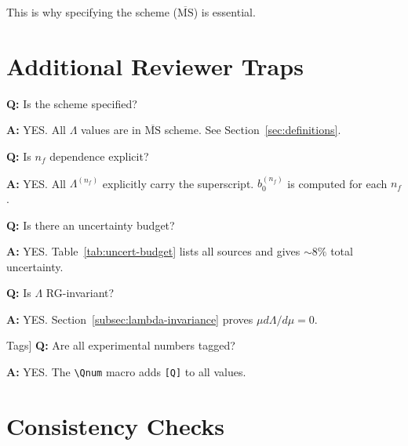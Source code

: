 \documentclass[11pt,a4paper]{article}
\theoremstyle{definition}
\begin{document}
This is why specifying the scheme ($\overline{\text{MS}}$) is essential.

\section{Additional Reviewer Traps}
\label{app:additional-traps}

\begin{trapbox}
\textbf{Q:} Is the scheme specified?

\textbf{A:} YES. All $\Lambda$ values are in $\overline{\text{MS}}$ scheme.
See Section~\ref{sec:definitions}.
\end{trapbox}

\begin{trapbox}
\textbf{Q:} Is $n_f$ dependence explicit?

\textbf{A:} YES. All $\Lambda^{(n_f)}$ explicitly carry the superscript.
$b_0^{(n_f)}$ is computed for each $n_f$.
\end{trapbox}

\begin{trapbox}
\textbf{Q:} Is there an uncertainty budget?

\textbf{A:} YES. Table~\ref{tab:uncert-budget} lists all sources and
gives $\sim 8\%$ total uncertainty.
\end{trapbox}

\begin{trapbox}
\textbf{Q:} Is $\Lambda$ RG-invariant?

\textbf{A:} YES. Section~\ref{subsec:lambda-invariance} proves
$\mu d\Lambda/d\mu = 0$.
\end{trapbox}

\begin{trapbox}[Trap 15: [Q] Tags]
\textbf{Q:} Are all experimental numbers tagged?

\textbf{A:} YES. The \texttt{\textbackslash Qnum} macro adds \texttt{[Q]}
to all values.
\end{trapbox}

\section{Consistency Checks}
\label{app:consistency}
\end{document}
